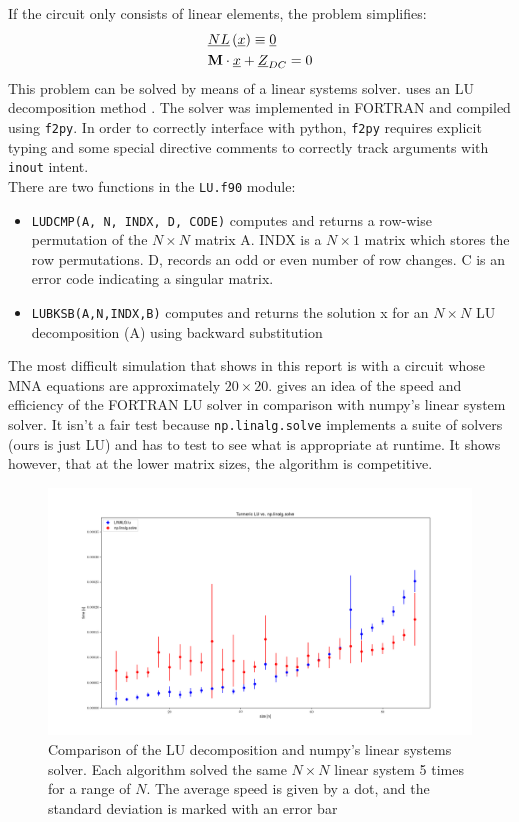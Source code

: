 If the circuit only consists of linear elements, the problem simplifies:
\begin{align*}
    &\underline{NL}\left(\underline{x} \right) \equiv \underline{0}\\
    &\mathbf{M}\cdot\underline{x} +\underline{Z}_{DC} = 0
\end{align*}
This problem can be solved by means of a linear systems solver. \turmeric uses an LU decomposition method \cite{press1992numerical}. The solver was implemented in FORTRAN and compiled using \texttt{f2py}. In order to correctly interface with python, \texttt{f2py} requires explicit typing and some special directive comments to correctly track arguments with \texttt{inout} intent.\\

There are two functions in the \texttt{LU.f90} module:
\begin{itemize}
    \item \texttt{LUDCMP(A, N, INDX, D, CODE)} computes and returns a row-wise permutation of the $N \times N$ matrix A. INDX is a $N\times 1$ matrix which stores the row permutations. D, records an odd or even number of row changes. C is an error code indicating a singular matrix.
    \item \texttt{LUBKSB(A,N,INDX,B)} computes and returns the solution x for an $N\times N$ LU decomposition (A) using backward substitution
\end{itemize}

The most difficult simulation that \turmeric shows in this report is with a circuit whose MNA equations are approximately $20\times 20$.  gives an idea of the speed and efficiency of the FORTRAN LU solver in comparison with numpy's linear system solver. It isn't a fair test because \texttt{np.linalg.solve} implements a suite of solvers (ours is just LU) and has to test to see what is appropriate at runtime. It shows however, that at the lower matrix sizes, the algorithm is competitive.\\

\begin{figure}
    \centering
    \includegraphics[width=\linewidth]{img/LUvnpsolve.png}
    \caption{Comparison of the \turmeric LU decomposition and numpy's linear systems solver. Each algorithm solved the same $N\times N$ linear system 5 times for a range of $N$. The average speed is given by a dot, and the standard deviation is marked with an error bar}
    \label{fig:VS}
\end{figure}

